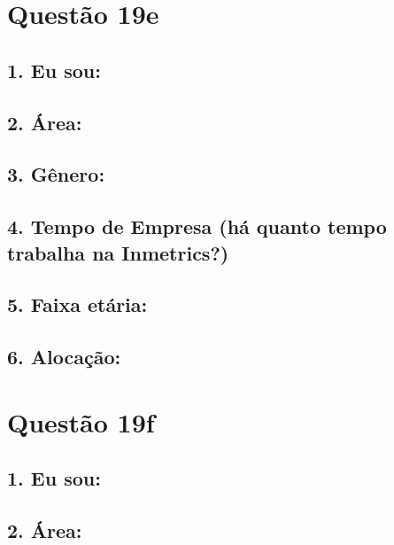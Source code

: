 \documentclass[]{book}
\begin{document}
\hypertarget{questao-19e}{%
\section{Questão 19e}\label{questao-19e}}

\hypertarget{eu-sou-49}{%
\subsection{1. Eu sou:}\label{eu-sou-49}}

\hypertarget{area-49}{%
\subsection{2. Área:}\label{area-49}}

\hypertarget{genero-49}{%
\subsection{3. Gênero:}\label{genero-49}}

\hypertarget{tempo-de-empresa-ha-quanto-tempo-trabalha-na-inmetrics-49}{%
\subsection{4. Tempo de Empresa (há quanto tempo trabalha na Inmetrics?)}\label{tempo-de-empresa-ha-quanto-tempo-trabalha-na-inmetrics-49}}

\hypertarget{faixa-etaria-49}{%
\subsection{5. Faixa etária:}\label{faixa-etaria-49}}

\hypertarget{alocacao-49}{%
\subsection{6. Alocação:}\label{alocacao-49}}

\hypertarget{questao-19f}{%
\section{Questão 19f}\label{questao-19f}}

\hypertarget{eu-sou-50}{%
\subsection{1. Eu sou:}\label{eu-sou-50}}

\hypertarget{area-50}{%
\subsection{2. Área:}\label{area-50}}
\end{document}
